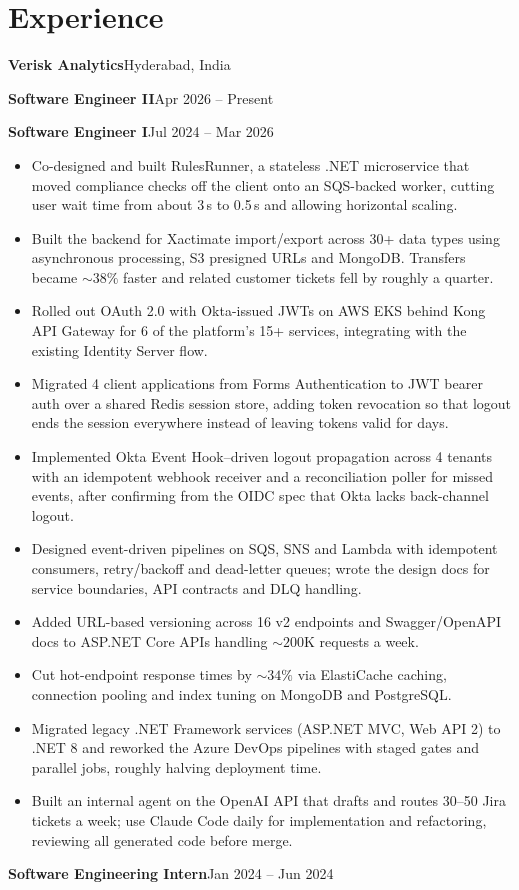 \documentclass[10pt,a4paper]{article}
\newcommand{\role}[2]{\noindent\textbf{#1}\hfill #2\par}
\newcommand{\org}[2]{\noindent\textbf{\large #1}\hfill #2\par\vspace{1pt}}
\begin{document}
\section{Experience}
\org{Verisk Analytics}{Hyderabad, India}
\role{Software Engineer II}{Apr 2026 -- Present}
\role{Software Engineer I}{Jul 2024 -- Mar 2026}
\begin{itemize}
  \item Co-designed and built RulesRunner, a stateless .NET microservice that moved compliance checks off the client onto an SQS-backed worker, cutting user wait time from about 3\,s to 0.5\,s and allowing horizontal scaling.
  \item Built the backend for Xactimate import/export across 30+ data types using asynchronous processing, S3 presigned URLs and MongoDB. Transfers became ${\sim}38\%$ faster and related customer tickets fell by roughly a quarter.
  \item Rolled out OAuth 2.0 with Okta-issued JWTs on AWS EKS behind Kong API Gateway for 6 of the platform's 15+ services, integrating with the existing Identity Server flow.
  \item Migrated 4 client applications from Forms Authentication to JWT bearer auth over a shared Redis session store, adding token revocation so that logout ends the session everywhere instead of leaving tokens valid for days.
  \item Implemented Okta Event Hook--driven logout propagation across 4 tenants with an idempotent webhook receiver and a reconciliation poller for missed events, after confirming from the OIDC spec that Okta lacks back-channel logout.
  \item Designed event-driven pipelines on SQS, SNS and Lambda with idempotent consumers, retry/backoff and dead-letter queues; wrote the design docs for service boundaries, API contracts and DLQ handling.
  \item Added URL-based versioning across 16 v2 endpoints and Swagger/OpenAPI docs to ASP.NET Core APIs handling ${\sim}200$K requests a week.
  \item Cut hot-endpoint response times by ${\sim}34\%$ via ElastiCache caching, connection pooling and index tuning on MongoDB and PostgreSQL.
  \item Migrated legacy .NET Framework services (ASP.NET MVC, Web API 2) to .NET 8 and reworked the Azure DevOps pipelines with staged gates and parallel jobs, roughly halving deployment time.
  \item Built an internal agent on the OpenAI API that drafts and routes 30--50 Jira tickets a week; use Claude Code daily for implementation and refactoring, reviewing all generated code before merge.
\end{itemize}
\vspace{1pt}
\role{Software Engineering Intern}{Jan 2024 -- Jun 2024}
\end{document}

